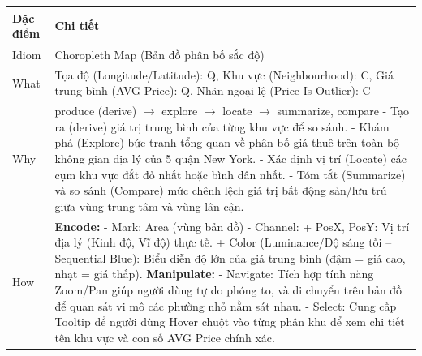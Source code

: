 \begin{longtable}{|p{2.8cm}|p{11.5cm}|}
\hline
\textbf{Đặc điểm} & \textbf{Chi tiết} \\
\hline
\endhead
\hline
\endfoot
Idiom & Choropleth Map (Bản đồ phân bố sắc độ) \\
\hline
What & Tọa độ (Longitude/Latitude): Q, Khu vực (Neighbourhood): C, Giá trung bình (AVG Price): Q, Nhãn ngoại lệ (Price Is Outlier): C \\
\hline
Why & produce (derive) $\rightarrow$ explore $\rightarrow$ locate $\rightarrow$ summarize, compare \newline
\newline
- Tạo ra (derive) giá trị trung bình của từng khu vực để so sánh. \newline
\newline
- Khám phá (Explore) bức tranh tổng quan về phân bố giá thuê trên toàn bộ không gian địa lý của 5 quận New York. \newline
\newline
- Xác định vị trí (Locate) các cụm khu vực đắt đỏ nhất hoặc bình dân nhất. \newline
\newline
- Tóm tắt (Summarize) và so sánh (Compare) mức chênh lệch giá trị bất động sản/lưu trú giữa vùng trung tâm và vùng lân cận. \\
\hline
How & \textbf{Encode:} \newline
\newline
- Mark: Area (vùng bản đồ) \newline
\newline
- Channel: \newline
\newline
\hspace{0.3cm} + PosX, PosY: Vị trí địa lý (Kinh độ, Vĩ độ) thực tế. \newline
\newline
\hspace{0.3cm} + Color (Luminance/Độ sáng tối -- Sequential Blue): Biểu diễn độ lớn của giá trung bình (đậm = giá cao, nhạt = giá thấp). \newline
\newline
\textbf{Manipulate:} \newline
\newline
- Navigate: Tích hợp tính năng Zoom/Pan giúp người dùng tự do phóng to, và di chuyển trên bản đồ để quan sát vi mô các phường nhỏ nằm sát nhau. \newline
\newline
- Select: Cung cấp Tooltip để người dùng Hover chuột vào từng phân khu để xem chi tiết tên khu vực và con số AVG Price chính xác. \newline

\end{longtable}
